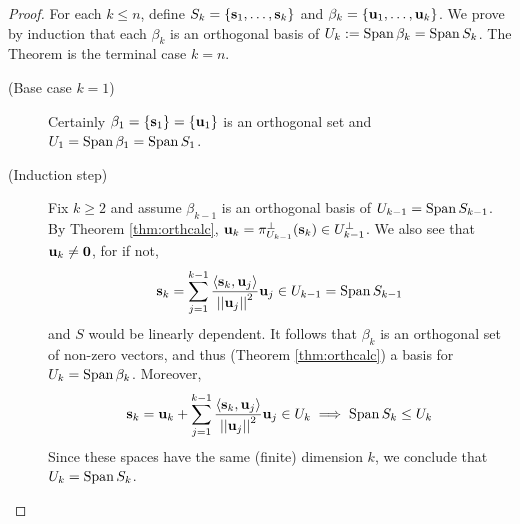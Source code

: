\begin{proof}
	For each $k\le n$, define $S_k=\{{\mathbf{{\mathbf{s}}}}_1,\ldots,{\mathbf{{\mathbf{s}}}}_{k}\}$ and $\beta_k=\{{\mathbf{{\mathbf{u}}}}_1,\ldots,{\mathbf{{\mathbf{u}}}}_{k}\}$. We prove by induction that each $\beta_k$ is an orthogonal basis of $U_k:=\operatorname{Span}\beta_k=\operatorname{Span} S_k$. The Theorem is the terminal case $k=n$.
	\begin{description}
		\item[\normalfont (Base case $k=1$)] Certainly $\beta_1=\{{\mathbf{s}}_1\}=\{{\mathbf{u}}_1\}$ is an orthogonal set and $U_1=\operatorname{Span}\beta_1=\operatorname{Span} S_1$.
		\item[\normalfont	(Induction step)] Fix $k\ge 2$ and assume $\beta_{k-1}$ is an orthogonal basis of $U_{k-1}=\operatorname{Span} S_{k-1}$. By Theorem \ref{thm:orthcalc}, ${\mathbf{u}}_k=\pi_{U_{k-1}}^\perp({\mathbf{s}}_k)\in U_{k-1}^\perp$. We also see that ${\mathbf{u}}_k\neq \mathbf{0}$, for if not,
		\[
			{\mathbf{s}}_k =\sum_{j=1}^{k-1}\frac{\left\langle {\mathbf{s}}_k,{\mathbf{u}}_j\right\rangle}{\left| \left| {\mathbf{u}}_j\right|\right|^2}{\mathbf{u}}_j\in U_{k-1}=\operatorname{Span} S_{k-1}
		\]
		and $S$ would be linearly dependent. It follows that $\beta_k$ is an orthogonal set of non-zero vectors, and thus (Theorem \ref{thm:orthcalc}) a basis for $U_k=\operatorname{Span}\beta_k$. Moreover,
		\[
			{\mathbf{s}}_k={\mathbf{u}}_k+\sum_{j=1}^{k-1}\frac{\left\langle {\mathbf{s}}_k,{\mathbf{u}}_j\right\rangle}{\left| \left| {\mathbf{u}}_j\right|\right|^2}{\mathbf{u}}_j\in U_k \implies \operatorname{Span} S_k\le U_k
		\]
		Since these spaces have the same (finite) dimension $k$, we conclude that $U_k=\operatorname{Span} S_k$.\qedhere
	\end{description}
\end{proof}



\pagebreak[3]


